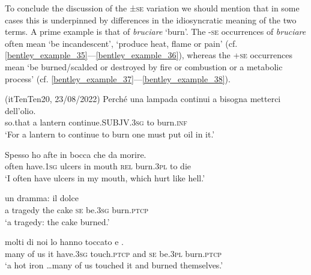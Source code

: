 \documentclass[output=paper,colorlinks,citecolor=brown
]{langscibook}
\begin{document}
To conclude the discussion of the ±\textsc{se} variation we should mention that in some cases this is underpinned by differences in the idiosyncratic meaning of the two terms. A prime example is that of \textit{bruciare} ‘burn’. The -\textsc{se} occurrences of \textit{bruciare} often mean ‘be incandescent’, ‘produce heat, flame or pain’ (cf. \ref{bentley_example_35}—\ref{bentley_example_36}), whereas the +\textsc{se} occurrences mean ‘be burned/scalded or destroyed by fire or combustion or a metabolic process’ (cf. \ref{bentley_example_37}—\ref{bentley_example_38}).

\hspace*{\fill}(itTenTen20, 23/08/2022)\quad
\ea \label{bentley_example_35}
    \gll Perché		una	lampada	continui											a 	 {bisogna metterci dell’olio.} \\
    	so.that		a				lantern			continue.SUBJV.3\textsc{sg}	to	burn.\textsc{inf} {} \\
    \glt 				‘For a lantern to continue to burn one must put oil in it.’
\z

\ea \label{bentley_example_36}
    \gll Spesso		ho						afte			in	bocca		che			da	morire. \\
    	often			have.1\textsc{sg}	ulcers	in	mouth	\textsc{rel}	burn.3\textsc{pl}		to		die \\
    \glt 				‘I often have ulcers in my mouth, which hurt like hell.’
\z

\ea \label{bentley_example_37}
    \gll  {\ldots}  un dramma: il		dolce  					 \\
    	{} a			tragedy		the	cake		\textsc{se}		be.3\textsc{sg}	burn.\textsc{ptcp} \\
    \glt 	‘a tragedy: the cake burned.’
\z

\ea \label{bentley_example_38}
     molti di		noi	lo	hanno			toccato				e								. \\
    	{} many	of		us		it	have.3\textsc{sg}	touch.\textsc{ptcp}		and	\textsc{se}	be.3\textsc{pl}		burn.\textsc{ptcp} \\
    \glt ‘a hot iron  \ldots  many of us touched it and burned themselves.’	
\z
\end{document}
